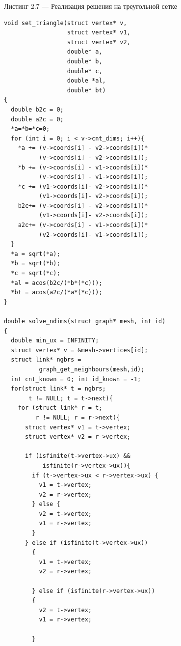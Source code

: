 \vspace{1em}
Листинг 2.7 --- Реализация решения на треугольной сетке
\normalsize
\begin{verbatim}
void set_triangle(struct vertex* v, 
                  struct vertex* v1, 
                  struct vertex* v2,
                  double* a, 
                  double* b, 
                  double* c,
                  double *al, 
                  double* bt)
{
  double b2c = 0;
  double a2c = 0;
  *a=*b=*c=0;
  for (int i = 0; i < v->cnt_dims; i++){
    *a += (v->coords[i] - v2->coords[i])*
          (v->coords[i] - v2->coords[i]);
    *b += (v->coords[i] - v1->coords[i])*
          (v->coords[i] - v1->coords[i]);
    *c += (v1->coords[i]- v2->coords[i])*
          (v1->coords[i]- v2->coords[i]);
    b2c+= (v->coords[i] - v2->coords[i])*
          (v1->coords[i]- v2->coords[i]);
    a2c+= (v->coords[i] - v1->coords[i])*
          (v2->coords[i]- v1->coords[i]);
  }
  *a = sqrt(*a);
  *b = sqrt(*b);
  *c = sqrt(*c);
  *al = acos(b2c/(*b*(*c)));
  *bt = acos(a2c/(*a*(*c)));
}

double solve_ndims(struct graph* mesh, int id)
{
  double min_ux = INFINITY;
  struct vertex* v = &mesh->vertices[id];
  struct link* ngbrs = 
          graph_get_neighbours(mesh,id);
  int cnt_known = 0; int id_known = -1;
  for(struct link* t = ngbrs; 
       t != NULL; t = t->next){
    for (struct link* r = t; 
         r != NULL; r = r->next){
      struct vertex* v1 = t->vertex;
      struct vertex* v2 = r->vertex;

      if (isfinite(t->vertex->ux) &&
           isfinite(r->vertex->ux)){
        if (t->vertex->ux < r->vertex->ux) {
          v1 = t->vertex;
          v2 = r->vertex;
        } else {
          v2 = t->vertex;
          v1 = r->vertex;
        }
      } else if (isfinite(t->vertex->ux))
        {
          v1 = t->vertex;
          v2 = r->vertex;

        } else if (isfinite(r->vertex->ux))
        {
          v2 = t->vertex;
          v1 = r->vertex;

        }


\end{verbatim}

